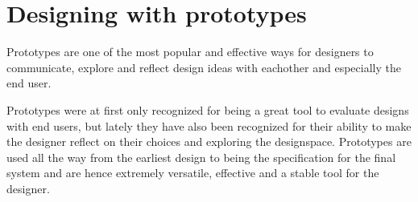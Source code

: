 \chapter{Designing with prototypes} \label{chap:prototypes}
Prototypes are one of the most popular and effective ways for designers to communicate, explore and reflect design ideas with eachother and especially the end user. \cite[p. 175]{benyon14}



\noindent Prototypes were at first only recognized for being a great tool to evaluate designs with end users, but lately they have also been recognized for their ability to make the designer reflect on their choices and exploring the designspace. \cite[7:2]{lim} Prototypes are used all the way from the earliest design to being the specification for the final system and are hence extremely versatile, effective and a stable tool for the designer. \cite[175]{benyon14}

\vfill \minitoc \newpage




